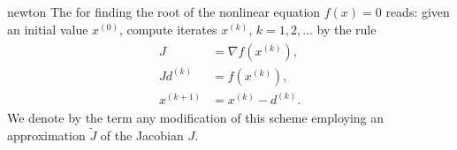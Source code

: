 \begin{Definition}{newton}
  The  for finding the root of the nonlinear
  equation $f(x) = 0$ reads: given an initial value $x^{(0)}$, compute
  iterates $x^{(k)}$, $k=1,2,\ldots$ by the rule
  \begin{gather}
    \label{eq:newton-def:1}
    \begin{split}
      J &= \nabla f\left(x^{(k)}\right),
      \\
       J d^{(k)} &= f(x^{(k)}),
      \\
      x^{(k+1)} &= x^{(k)} - d^{(k)}.
    \end{split}
  \end{gather}
  We denote by the term  any modification
  of this scheme employing an approximation $\widetilde J$ of the
  Jacobian $J$.
\end{Definition}

